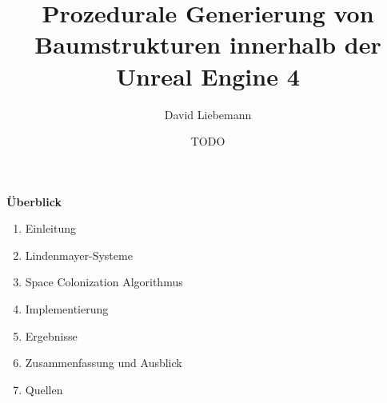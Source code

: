 \documentclass[20pt,landscape]{extarticle}
\title{Prozedurale Generierung von Baumstrukturen innerhalb der Unreal Engine 4}
\author{David Liebemann}
\date{TODO}
\begin{document}
\mytitlepage

\newpage
\noindent
{\Large \textbf{Überblick}} 
\slidetitle{}
\begin{enumerate}
	\item Einleitung 
	\item Lindenmayer-Systeme
	\item Space Colonization Algorithmus
	\item Implementierung
	\item Ergebnisse
	\item Zusammenfassung und Ausblick
	\item Quellen
\end{enumerate}










\end{document}
